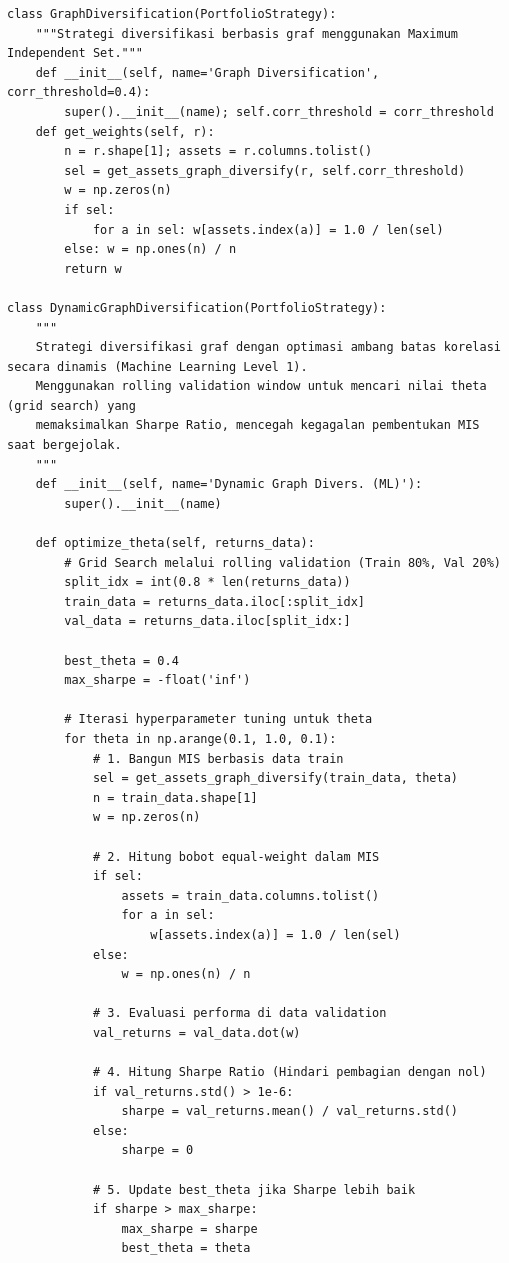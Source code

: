 \documentclass[12pt,a4paper]{article}
\begin{document}
\begin{lstlisting}[caption={Kelas-kelas strategi portofolio}]
class GraphDiversification(PortfolioStrategy):
    """Strategi diversifikasi berbasis graf menggunakan Maximum Independent Set."""
    def __init__(self, name='Graph Diversification', corr_threshold=0.4):
        super().__init__(name); self.corr_threshold = corr_threshold
    def get_weights(self, r):
        n = r.shape[1]; assets = r.columns.tolist()
        sel = get_assets_graph_diversify(r, self.corr_threshold)
        w = np.zeros(n)
        if sel:
            for a in sel: w[assets.index(a)] = 1.0 / len(sel)
        else: w = np.ones(n) / n
        return w

class DynamicGraphDiversification(PortfolioStrategy):
    """
    Strategi diversifikasi graf dengan optimasi ambang batas korelasi secara dinamis (Machine Learning Level 1).
    Menggunakan rolling validation window untuk mencari nilai theta (grid search) yang 
    memaksimalkan Sharpe Ratio, mencegah kegagalan pembentukan MIS saat bergejolak.
    """
    def __init__(self, name='Dynamic Graph Divers. (ML)'):
        super().__init__(name)

    def optimize_theta(self, returns_data):
        # Grid Search melalui rolling validation (Train 80%, Val 20%)
        split_idx = int(0.8 * len(returns_data))
        train_data = returns_data.iloc[:split_idx]
        val_data = returns_data.iloc[split_idx:]
        
        best_theta = 0.4
        max_sharpe = -float('inf')
        
        # Iterasi hyperparameter tuning untuk theta
        for theta in np.arange(0.1, 1.0, 0.1):
            # 1. Bangun MIS berbasis data train
            sel = get_assets_graph_diversify(train_data, theta)
            n = train_data.shape[1]
            w = np.zeros(n)
            
            # 2. Hitung bobot equal-weight dalam MIS
            if sel:
                assets = train_data.columns.tolist()
                for a in sel: 
                    w[assets.index(a)] = 1.0 / len(sel)
            else:
                w = np.ones(n) / n
                
            # 3. Evaluasi performa di data validation
            val_returns = val_data.dot(w)
            
            # 4. Hitung Sharpe Ratio (Hindari pembagian dengan nol)
            if val_returns.std() > 1e-6:
                sharpe = val_returns.mean() / val_returns.std()
            else:
                sharpe = 0
                
            # 5. Update best_theta jika Sharpe lebih baik
            if sharpe > max_sharpe:
                max_sharpe = sharpe
                best_theta = theta
                

\end{lstlisting}
\end{document}
